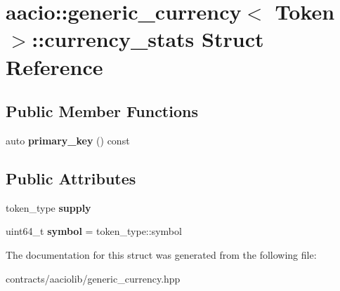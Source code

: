 \hypertarget{structaacio_1_1generic__currency_1_1currency__stats}{}\section{aacio\+:\+:generic\+\_\+currency$<$ Token $>$\+:\+:currency\+\_\+stats Struct Reference}
\label{structaacio_1_1generic__currency_1_1currency__stats}
\subsection*{Public Member Functions}
\begin{DoxyCompactItemize}
\item 
\mbox{\label{structaacio_1_1generic__currency_1_1currency__stats_aa43ad746b91c0978ce5412453c299a30}} 
auto {\bfseries primary\+\_\+key} () const
\end{DoxyCompactItemize}
\subsection*{Public Attributes}
\begin{DoxyCompactItemize}
\item 
\mbox{\label{structaacio_1_1generic__currency_1_1currency__stats_a040011ad00bd984978f1c1e8e8e759c7}} 
token\+\_\+type {\bfseries supply}
\item 
\mbox{\label{structaacio_1_1generic__currency_1_1currency__stats_afc5955aa9a398a850f4a7a89cf23f53f}} 
uint64\+\_\+t {\bfseries symbol} = token\+\_\+type\+::symbol
\end{DoxyCompactItemize}


The documentation for this struct was generated from the following file\+:\begin{DoxyCompactItemize}
\item 
contracts/aaciolib/generic\+\_\+currency.\+hpp\end{DoxyCompactItemize}
